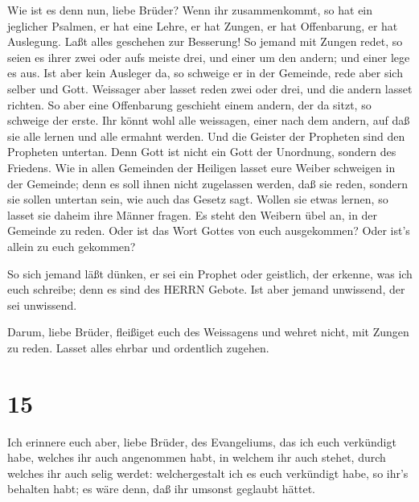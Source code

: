  Wie ist es denn nun, liebe Brüder? Wenn ihr zusammenkommt,
so hat ein jeglicher Psalmen, er hat eine Lehre, er hat Zungen, er hat
Offenbarung, er hat Auslegung. Laßt alles geschehen zur Besserung!
 So jemand mit Zungen redet, so seien es ihrer zwei oder
aufs meiste drei, und einer um den andern; und einer lege es aus.
 Ist aber kein Ausleger da, so schweige er in der Gemeinde,
rede aber sich selber und Gott.  Weissager aber lasset
reden zwei oder drei, und die andern lasset richten.  So
aber eine Offenbarung geschieht einem andern, der da sitzt, so schweige
der erste.  Ihr könnt wohl alle weissagen, einer nach dem
andern, auf daß sie alle lernen und alle ermahnt werden. 
Und die Geister der Propheten sind den Propheten untertan. 
Denn Gott ist nicht ein Gott der Unordnung, sondern des Friedens.
 Wie in allen Gemeinden der Heiligen lasset eure Weiber
schweigen in der Gemeinde; denn es soll ihnen nicht zugelassen werden,
daß sie reden, sondern sie sollen untertan sein, wie auch das Gesetz
sagt.  Wollen sie etwas lernen, so lasset sie daheim ihre
Männer fragen. Es steht den Weibern übel an, in der Gemeinde zu reden.
 Oder ist das Wort Gottes von euch ausgekommen? Oder ist's
allein zu euch gekommen?

 So sich jemand läßt dünken, er sei ein Prophet oder
geistlich, der erkenne, was ich euch schreibe; denn es sind des HERRN
Gebote.  Ist aber jemand unwissend, der sei unwissend.

 Darum, liebe Brüder, fleißiget euch des Weissagens und
wehret nicht, mit Zungen zu reden.  Lasset alles ehrbar und
ordentlich zugehen.

\hypertarget{section-14}{%
\section{15}\label{section-14}}

 Ich erinnere euch aber, liebe Brüder, des Evangeliums, das
ich euch verkündigt habe, welches ihr auch angenommen habt, in welchem
ihr auch stehet,  durch welches ihr auch selig werdet:
welchergestalt ich es euch verkündigt habe, so ihr's behalten habt; es
wäre denn, daß ihr umsonst geglaubt hättet.

